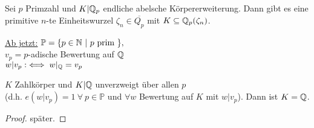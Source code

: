 \begin{Satz}
Sei $p$ Primzahl und $K|\mathbb{Q}_p$ endliche abelsche Körpererweiterung. Dann gibt es eine primitive $n$-te Einheitswurzel $\zeta_n \in \overline{Q_p}$ mit $K \subseteq \mathbb{Q}_p(\zeta_n)$.
\end{Satz}

\underline{Ab jetzt:} $\mathbb{P} = \{p \in \N \ | \ p \text{ prim } \},$\\
$v_p=p$-adische Bewertung auf $\mathbb{Q}$\\
$w|v_p :\iff w|_{\mathbb{Q}} =v_p$

\begin{Prop}
$K$ Zahlkörper und $K|\mathbb{Q}$ unverzweigt über allen $p$\\
(d.h. $e(w|v_p)=1 \ \forall \ p \in \mathbb{P}$ und $\forall w $ Bewertung auf $K$ mit $w|v_p$). Dann ist $K=\mathbb{Q}$.
\end{Prop}

\begin{proof}
später.
\end{proof}

